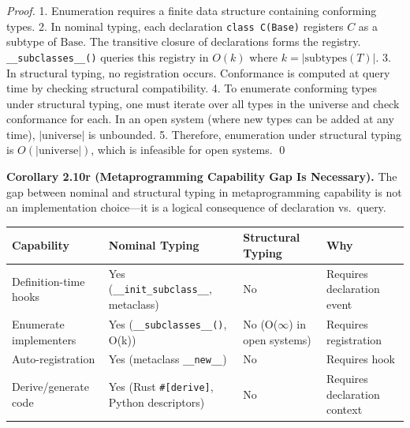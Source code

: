 \emph{Proof.} 1. Enumeration requires a finite data structure containing
conforming types. 2. In nominal typing, each declaration
\texttt{class\ C(Base)} registers \(C\) as a subtype of \(\text{Base}\).
The transitive closure of declarations forms the registry.
\texttt{\_\_subclasses\_\_()} queries this registry in \(O(k)\) where
\(k = |\text{subtypes}(T)|\). 3. In structural typing, no registration
occurs. Conformance is computed at query time by checking structural
compatibility. 4. To enumerate conforming types under structural typing,
one must iterate over all types in the universe and check conformance
for each. In an open system (where new types can be added at any time),
\(|\text{universe}|\) is unbounded. 5. Therefore, enumeration under
structural typing is \(O(|\text{universe}|)\), which is infeasible for
open systems. \qed

\textbf{Corollary 2.10r (Metaprogramming Capability Gap Is Necessary).}
The gap between nominal and structural typing in metaprogramming
capability is not an implementation choice---it is a logical consequence
of declaration vs.~query.

\small
\begin{longtable}[]{@{}
  >{\raggedright\arraybackslash}p{}
  >{\raggedright\arraybackslash}p{}
  >{\raggedright\arraybackslash}p{}
  >{\raggedright\arraybackslash}p{}@{}}
\toprule\noalign{}
\begin{minipage}[b]{\linewidth}\raggedright
Capability
\end{minipage} & \begin{minipage}[b]{\linewidth}\raggedright
Nominal Typing
\end{minipage} & \begin{minipage}[b]{\linewidth}\raggedright
Structural Typing
\end{minipage} & \begin{minipage}[b]{\linewidth}\raggedright
Why
\end{minipage} \\
\midrule\noalign{}
\endhead
\bottomrule\noalign{}
\endlastfoot
Definition-time hooks & Yes (\texttt{\_\_init\_subclass\_\_}, metaclass)
& No & Requires declaration event \\
Enumerate implementers & Yes (\texttt{\_\_subclasses\_\_()}, O(k)) & No
(O($\infty$) in open systems) & Requires registration \\
Auto-registration & Yes (metaclass \texttt{\_\_new\_\_}) & No & Requires
hook \\
Derive/generate code & Yes (Rust \texttt{\#{[}derive{]}}, Python
descriptors) & No & Requires declaration context \\
\end{longtable}

